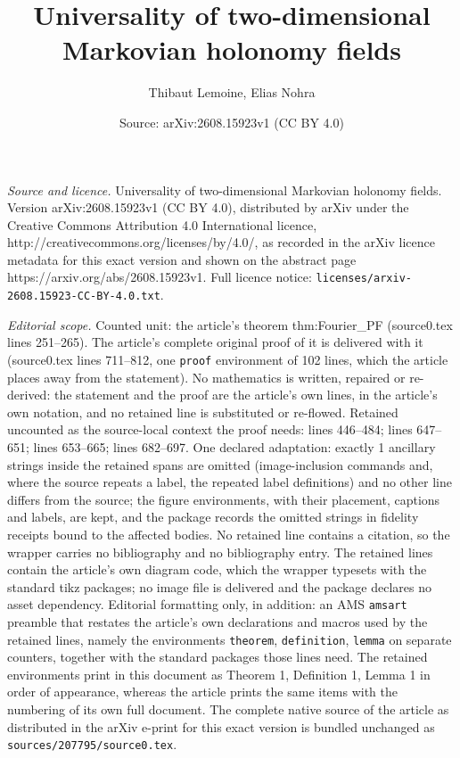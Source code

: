 \documentclass[10pt,a4paper]{amsart}
\title{Universality of two-dimensional Markovian holonomy fields}
\author{Thibaut Lemoine, Elias Nohra}
\date{Source: arXiv:2608.15923v1 (CC BY 4.0)}
\begin{document}
\maketitle

\noindent\emph{Source and licence.} Universality of two-dimensional Markovian holonomy fields. Version arXiv:2608.15923v1 (CC BY 4.0), distributed by arXiv under the Creative Commons Attribution 4.0 International licence, http://creativecommons.org/licenses/by/4.0/, as recorded in the arXiv licence metadata for this exact version and shown on the abstract page https://arxiv.org/abs/2608.15923v1. Full licence notice: \texttt{licenses/arxiv-2608.15923-CC-BY-4.0.txt}.\par\smallskip

\noindent\textit{Editorial scope.} Counted unit: the article's theorem thm:Fourier\_PF (source0.tex lines 251--265). The article's complete original proof of it is delivered with it (source0.tex lines 711--812, one \texttt{proof} environment of 102 lines, which the article places away from the statement). No mathematics is written, repaired or re-derived: the statement and the proof are the article's own lines, in the article's own notation, and no retained line is substituted or re-flowed.  Retained uncounted as the source-local context the proof needs: lines 446--484; lines 647--651; lines 653--665; lines 682--697.  One declared adaptation: exactly 1 ancillary strings inside the retained spans are omitted (image-inclusion commands and, where the source repeats a label, the repeated label definitions) and no other line differs from the source; the figure environments, with their placement, captions and labels, are kept, and the package records the omitted strings in fidelity receipts bound to the affected bodies.  No retained line contains a citation, so the wrapper carries no bibliography and no bibliography entry.  The retained lines contain the article's own diagram code, which the wrapper typesets with the standard tikz packages; no image file is delivered and the package declares no asset dependency.  Editorial formatting only, in addition: an AMS \texttt{amsart} preamble that restates the article's own declarations and macros used by the retained lines, namely the environments \texttt{theorem}, \texttt{definition}, \texttt{lemma} on separate counters, together with the standard packages those lines need.  The retained environments print in this document as Theorem 1, Definition 1, Lemma 1 in order of appearance, whereas the article prints the same items with the numbering of its own full document.  The complete native source of the article as distributed in the arXiv e-print for this exact version is bundled unchanged as \texttt{sources/207795/source0.tex}.
\end{document}
